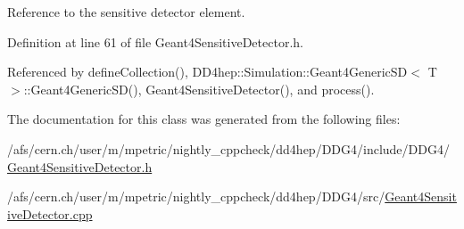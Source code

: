 Reference to the sensitive detector element. 



Definition at line 61 of file Geant4\+Sensitive\+Detector.\+h.



Referenced by define\+Collection(), D\+D4hep\+::\+Simulation\+::\+Geant4\+Generic\+S\+D$<$ T $>$\+::\+Geant4\+Generic\+S\+D(), Geant4\+Sensitive\+Detector(), and process().



The documentation for this class was generated from the following files\+:\begin{DoxyCompactItemize}
\item 
/afs/cern.\+ch/user/m/mpetric/nightly\+\_\+cppcheck/dd4hep/\+D\+D\+G4/include/\+D\+D\+G4/\hyperlink{_geant4_sensitive_detector_8h}{Geant4\+Sensitive\+Detector.\+h}\item 
/afs/cern.\+ch/user/m/mpetric/nightly\+\_\+cppcheck/dd4hep/\+D\+D\+G4/src/\hyperlink{_geant4_sensitive_detector_8cpp}{Geant4\+Sensitive\+Detector.\+cpp}\end{DoxyCompactItemize}
